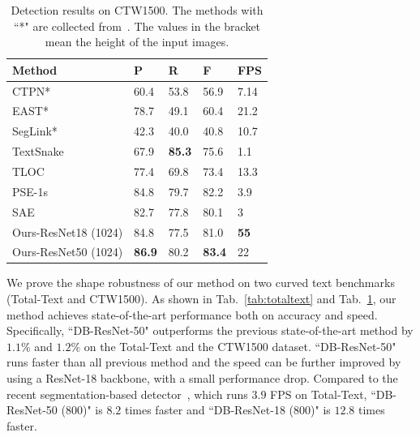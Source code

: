 \documentclass[letterpaper]{article} %
\newcommand{\minisection}[1]{\noindent{\textbf{#1}}}
\begin{document}
\begin{table}[!ht]
\centering
\caption{Detection results on CTW1500. The methods with ``*" are collected from~\cite{ctw1500}. The values in the bracket mean the height of the input images.}
\begin{tabularx}{1.0\linewidth}{@{}l*{4}X@{}}
\toprule
Method        & P             & R             & F             & FPS         \\ \midrule
CTPN*          & 60.4          & 53.8          & 56.9          & 7.14        \\
EAST*          & 78.7          & 49.1          & 60.4          & 21.2        \\
SegLink*       & 42.3            & 40.0            & 40.8            & 10.7         \\
TextSnake~\cite{long2018textsnake}     & 67.9          & \textbf{85.3}          & 75.6          & 1.1         \\
TLOC~\cite{ctw1500}     & 77.4            & 69.8          & 73.4          & 13.3           \\
PSE-1s~\cite{wang2019shape}    & 84.8         & 79.7          & 82.2          & 3.9         \\
SAE~\cite{tian2019learning}       & 82.7          & 77.8          & 80.1    & 3  \\
\midrule
Ours-ResNet18 (1024) & 84.8          & 77.5          & 81.0          & \textbf{55} \\
Ours-ResNet50 (1024) & \textbf{86.9} & 80.2 & \textbf{83.4} & 22          \\ \bottomrule
\end{tabularx}
\label{tab:CTW}
\end{table}

\minisection{Curved text detection}
We prove the shape robustness of our method on two curved text benchmarks (Total-Text and CTW1500). As shown in Tab.~\ref{tab:totaltext} and Tab.~\ref{tab:CTW}, our method achieves state-of-the-art performance both on accuracy and speed.
Specifically, ``DB-ResNet-50" outperforms the previous state-of-the-art method by $1.1\%$ and $1.2\%$ on the Total-Text and the CTW1500 dataset.
``DB-ResNet-50" runs faster than all previous method and the speed can be further improved by using a ResNet-18 backbone, with a small performance drop.
Compared to the recent segmentation-based detector~\cite{wang2019shape}, which runs $3.9$ FPS on Total-Text, ``DB-ResNet-50 (800)" is $8.2$ times faster and ``DB-ResNet-18 (800)" is $12.8$ times faster.
\end{document}
